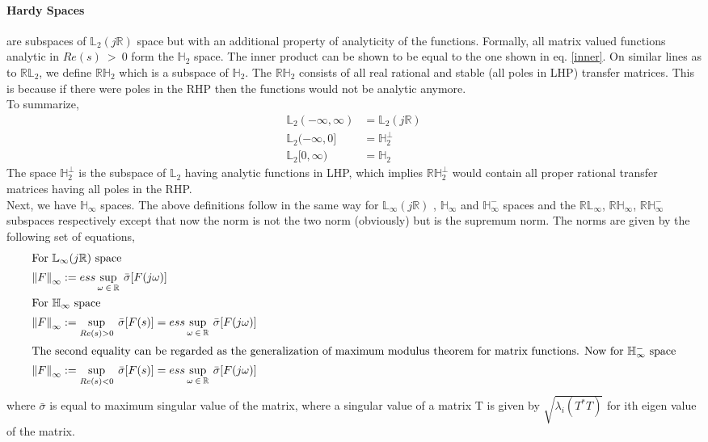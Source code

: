 \documentclass[a4paper,12pt]{article}
\newcommand\norm[1]{\left\lVert#1\right\rVert}
\begin{document}
		\paragraph{Hardy Spaces} are subspaces of $\mathbb{L}_{2}(j\mathbb{R})$ space but with an additional property of analyticity of the functions. Formally, all matrix valued functions analytic in $Re(s)\: > \:0$ form the $\mathbb{H}_{2}$ space. The inner product can be shown to be equal to the one shown in eq. \ref{inner}. On similar lines as to  $\mathbb{RL}_{2}$, we define  $\mathbb{RH}_{2}$ which is a subspace of $\mathbb{H}_{2}$. The $\mathbb{RH}_{2}$ consists of all real rational and stable (all poles in LHP) transfer matrices. This is because if there were poles in the RHP then the functions would not be analytic anymore.\\ To summarize,
		\begin{align*}
		 	\mathbb{L}_{2}(-\infty,\infty) &= \mathbb{L}_{2}(j\mathbb{R}) \\
		 	\mathbb{L}_{2}(-\infty,0] &= \mathbb{H}_{2}^{\perp} \\
		 	\mathbb{L}_{2}[0,\infty) &= \mathbb{H}_{2}
		 \end{align*}
		 The space $\mathbb{H}_{2}^{\perp}$ is the subspace of $\mathbb{L}_{2}$ having analytic functions in LHP, which implies  $\mathbb{RH}_{2}^{\perp}$ would contain all proper rational transfer matrices having all poles in the RHP.
		\\Next, we have  $\mathbb{H}_{\infty}$ spaces. The above definitions follow in the same way for $\mathbb{L}_{\infty}(j\mathbb{R})$ , $\mathbb{H}_{\infty}$ and $\mathbb{H}_{\infty}^{-}$ spaces and the $\mathbb{RL}_{\infty}$, $\mathbb{RH}_{\infty}$, $\mathbb{RH}_{\infty}^{-}$ subspaces respectively except that now the norm is not the two norm (obviously) but is the supremum norm. The norms are given by the following set of equations,
		\begin{align}
		\intertext{For $\mathbb{L}_{\infty}(j\mathbb{R})$ space}
		\norm{F}_{\infty} &:= ess \sup_{\omega\:\in\:\mathbb{R}} \: \bar{\sigma} [F(j\omega)] \\
		\intertext{For $\mathbb{H}_{\infty}$ space}
		\norm{F}_{\infty} &:= \sup_{Re(s) > 0} \: \bar{\sigma} [F(s)] = ess \sup_{\omega\:\in\:\mathbb{R}} \: \bar{\sigma} [F(j\omega)] \\
		\intertext{The second equality can be regarded as the generalization of maximum modulus theorem for matrix functions. Now for $\mathbb{H}_{\infty}^{-}$ space}
		\norm{F}_{\infty} &:= \sup_{Re(s) < 0} \: \bar{\sigma} [F(s)] = ess \sup_{\omega\:\in\:\mathbb{R}} \: \bar{\sigma} [F(j\omega)]
		\end{align}
		where $\bar{\sigma}$ is equal to maximum singular value of the matrix, where a singular value of a matrix T is given by $\sqrt{\lambda_{i}(T^{*}T)}$ for ith eigen value of the matrix.
\end{document}
